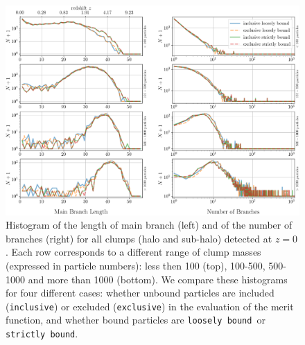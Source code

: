 \documentclass[a4paper,twocolumn,fleqn,usenatbib]{mnras}
\newcommand{\exc}{\texttt{exclusive}}
\newcommand{\inc}{\texttt{inclusive}}
\newcommand{\sad}{\texttt{strictly bound}}
\newcommand{\nosad}{\texttt{loosely bound}}
\begin{document}
\begin{figure}
  \centering
  \includegraphics[width=\textwidth,keepaspectratio]{images/tree-statistics-my-threshold/tree_geometry-inc-excl.png}
  \caption{Histogram of the length of main branch (left) and of the
    number of branches (right) for all clumps (halo and sub-halo)
    detected at $z=0$. Each row corresponds to a different range of
    clump masses (expressed in particle numbers): less then 100 (top),
    100-500, 500-1000 and more than 1000 (bottom). We compare these
    histograms for four different cases: whether unbound particles are
    included (\inc) or excluded (\exc) in the evaluation of the merit
    function, and whether bound particles are \nosad\ or \sad.
  }%
  \label{fig:saddle_nosaddle_mbl_nbranch}
\end{figure}
\end{document}
